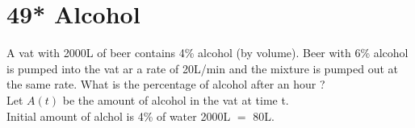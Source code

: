 \section*{49* Alcohol }
A vat with 2000L of beer contains 4\% alcohol (by volume). Beer with 6\% alcohol is pumped into the vat ar a rate of 20L/min and the mixture is pumped out at the same rate. What is the percentage of alcohol after an hour ? \\

Let $A(t)$ be the amount of alcohol in the vat at time t. \\
Initial amount of alchol is 4\% of water 2000L $=$ 80L. \\

